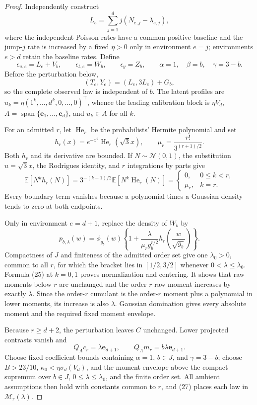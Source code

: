 \documentclass{article}
\begin{document}
\begin{proof}
Independently construct
\[
 L_e=\sum_{j=1}^d j(N_{e,j}-\lambda_{e,j}),
\]
where the independent Poisson rates have a common positive baseline and the jump-\(j\) rate is increased by a fixed \(\eta>0\) only in environment \(e=j\); environments \(e>d\) retain the baseline rates.  Define
\[
 \epsilon_{u,e}=L_e+V_b,\qquad
 \epsilon_{t,e}=W_b,\qquad
 \epsilon_y=Z_b,\qquad
 \alpha=1,\quad\beta=b,\quad\gamma=3-b.                                 \tag{22}
\]
Before the perturbation below,
\[
 (T_e,Y_e)=(L_e,3L_e)+G_b,                                                 \tag{23}
\]
so the complete observed law is independent of \(b\).  The latent profiles are \(u_k=\eta(1^k,\ldots,d^k,0,\ldots,0)^\top\), whence the leading calibration block is \(\eta V_d\), \(A=\operatorname{span}\{\mathbf e_1,\ldots,\mathbf e_d\}\), and \(u_k\in A\) for all \(k\).

For an admitted \(r\), let \(\operatorname{He}_r\) be the probabilists' Hermite polynomial and set
\[
 h_r(x)=e^{-x^2}\operatorname{He}_r(\sqrt3x),
 \qquad \mu_r=\frac{r!}{3^{(r+1)/2}}.                                    \tag{24}
\]
Both \(h_r\) and its derivative are bounded.  If \(N\sim\mathcal N(0,1)\), the substitution \(u=\sqrt3x\), the Rodrigues identity, and \(r\) integrations by parts give
\[
 \mathbb E[N^kh_r(N)]
 =3^{-(k+1)/2}\mathbb E[N^k\operatorname{He}_r(N)]
 =\begin{cases}0,&0\leq k<r,\\ \mu_r,&k=r.\end{cases}                   \tag{25}
\]
Every boundary term vanishes because a polynomial times a Gaussian density tends to zero at both endpoints.

Only in environment \(e=d+1\), replace the density of \(W_b\) by
\[
 p_{b,\lambda}(w)=\phi_{g_b}(w)
 \left\{1+\frac{\lambda}{\mu_rg_b^{r/2}}
 h_r\!\left(\frac w{\sqrt{g_b}}\right)\right\}.                         \tag{26}
\]
Compactness of \(J\) and finiteness of the admitted order set give one \(\lambda_0>0\), common to all \(r\), for which the bracket lies in \([1/2,3/2]\) whenever \(0<\lambda\leq\lambda_0\).  Formula (25) at \(k=0,1\) proves normalization and centering.  It shows that raw moments below \(r\) are unchanged and the order-\(r\) raw moment increases by exactly \(\lambda\).  Since the order-\(r\) cumulant is the order-\(r\) moment plus a polynomial in lower moments, its increase is also \(\lambda\).  Gaussian domination gives every absolute moment and the required fixed moment envelope.

Because \(r\geq d+2\), the perturbation leaves \(C\) unchanged.  Lower projected contrasts vanish and
\[
 Q_Ac_r=\lambda\mathbf e_{d+1},
 \qquad Q_Am_r=b\lambda\mathbf e_{d+1}.                                  \tag{27}
\]
Choose fixed coefficient bounds containing \(\alpha=1\), \(b\in J\), and \(\gamma=3-b\); choose \(B>23/10\), \(\kappa_0<\eta\sigma_d(V_d)\), and the moment envelope above the compact supremum over \(b\in J\), \(0\leq\lambda\leq\lambda_0\), and the finite order set.  All ambient assumptions then hold with constants common to \(r\), and (27) places each law in \(\mathcal M_r(\lambda)\).


\end{proof}
\end{document}
